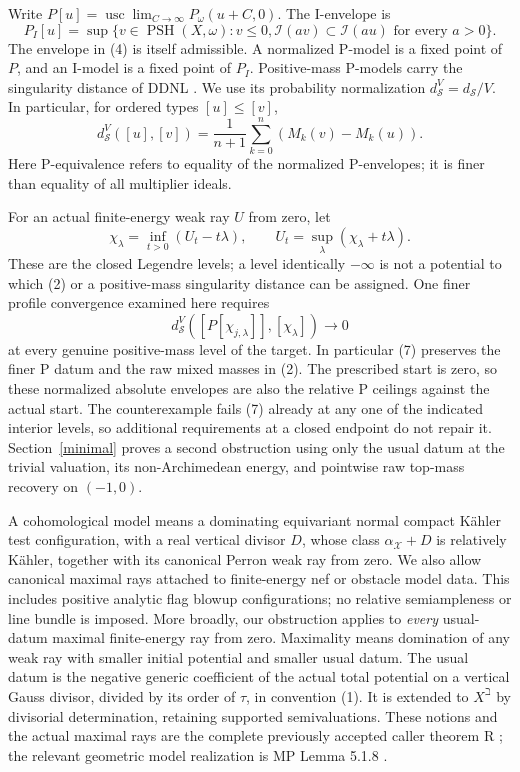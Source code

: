 \documentclass[11pt]{article}
\newcommand{\PSH}{\operatorname{PSH}}
\newcommand{\MI}{\mathcal I}
\newcommand{\ds}{d_{\mathcal S}}
\begin{document}
Write $P[u]=\operatorname{usc}\lim_{C\to\infty}P_\omega(u+C,0)$.
The I-envelope is
\[
 P_I[u]=\sup\{v\in\PSH(X,\omega):v\le0,
                 \MI(av)\subset\MI(au)\text{ for every }a>0\}.
                                                               \tag{4}
\]
The envelope in (4) is itself admissible. A normalized P-model is a
fixed point of $P$, and an I-model is a fixed point of $P_I$.
Positive-mass P-models carry the singularity distance of DDNL
\cite{DDNL}. We use its probability normalization $\ds^V=\ds/V$.
In particular, for ordered types $[u]\le[v]$,
\[
 \ds^V([u],[v])=\frac1{n+1}\sum_{k=0}^n(M_k(v)-M_k(u)).        \tag{5}
\]
Here P-equivalence refers to equality of the normalized P-envelopes;
it is finer than equality of all multiplier ideals.

For an actual finite-energy weak ray $U$ from zero, let
\[
 \chi_\lambda=\inf_{t>0}(U_t-t\lambda),\qquad
 U_t=\sup_\lambda(\chi_\lambda+t\lambda).                    \tag{6}
\]
These are the closed Legendre levels; a level identically $-\infty$
is not a potential to which (2) or a positive-mass singularity distance
can be assigned. One finer profile convergence examined here requires
\[
 \ds^V([P[\chi_{j,\lambda}]],[\chi_\lambda])\longrightarrow0
                                                               \tag{7}
\]
at every genuine positive-mass level of the target. In particular (7)
preserves the finer P datum and the raw mixed masses in (2).
The prescribed start is zero, so these normalized absolute envelopes
are also the relative P ceilings against the actual start.
The counterexample fails (7) already at any one of the indicated
interior levels, so additional requirements at a closed endpoint do
not repair it. Section~\ref{minimal} proves a second obstruction using
only the usual datum at the trivial valuation, its non-Archimedean
energy, and pointwise raw top-mass recovery on $(-1,0)$.

A cohomological model means a dominating equivariant normal compact
K\"ahler test configuration, with a real vertical divisor $D$, whose
class $\alpha_{\mathcal X}+D$ is relatively K\"ahler, together with its
canonical Perron weak ray from zero. We also allow canonical maximal
rays attached to finite-energy nef or obstacle model data. This includes
positive analytic flag blowup configurations; no relative semiampleness
or line bundle is imposed. More broadly, our obstruction applies to
\emph{every} usual-datum maximal finite-energy ray from zero.
Maximality means domination of any weak ray with smaller initial
potential and smaller usual datum. The usual datum is the negative
generic coefficient of the actual total potential on a vertical Gauss
divisor, divided by its order of $\tau$, in convention (1).
It is extended to $X^\beth$ by divisorial determination, retaining
supported semivaluations. These notions and the actual maximal rays
are the complete previously accepted caller theorem R \cite{R};
the relevant geometric model realization is MP Lemma 5.1.8 \cite{MP}.
\end{document}
